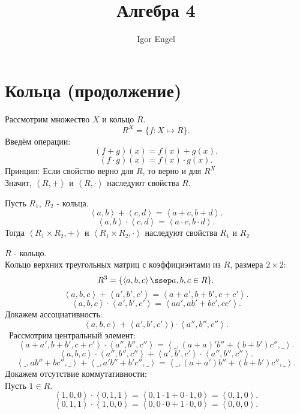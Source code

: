\documentclass[11pt, oneside]{article}   	%
\title{Алгебра 4}
\author{Igor Engel}
\date{}
\begin{document}
\maketitle
\section{Кольца (продолжение)}
    \begin{definition}
        Рассмотрим множество $X$ и кольцо  $R$.\\
         \[ R^{X} = \{f: X \mapsto R\}  .\] 
        Введём операции:
        \[ (f+g)(x) = f(x)+g(x) .\]
        \[ (f\cdot g)(x) = f(x)\cdot g(x) .\]
        Принцип: Если свойство верно для $R$, то верно и для  $R^{X}$ \\
        Значит, $\left<R, +\right>$ и $\left<R, \cdot \right>$ наследуют свойства $R$.
    \end{definition}
    \begin{definition}
        Пусть $R_1$, $R_2$ - кольца.\\
        \[ \left<a, b\right> + \left<c, d\right> = \left<a+c, b+d\right> .\]
        \[ \left<a, b\right>\cdot \left<c, d\right> = \left<a\cdot c, b\cdot d\right> .\] 
        Тогда $\left<R_1 \times R_2, +\right>$ и $\left<R_1 \times R_2, \cdot \right>$ наследуют свойства $R_1$ и $R_2$
    \end{definition} 
    \begin{definition}
        $R$ - кольцо.\\
        Кольцо верхних треугольных матриц с коэффициэнтами из $R$, размера $2\times 2$:
        \[ R^{3} = \{\left<a, b, c\right> \ssep a, b, c\in R\}  .\]
        \[ \left<a, b, c\right> + \left<a', b', c'\right> = \left<a+a', b+b', c+c'\right> .\] 
        \[ \left<a, b, c\right> \cdot \left<a', b', c'\right> = \left<aa', ab' + bc', cc'\right>.\]
        Докажем ассоциативность:
        \[ \left<a, b, c\right> + \left<a', b', c'\right>) \cdot \left<a'', b'', c''\right> .\]\
        Рассмотрим центральный элемент:
        \[ \left<a+a', b+b', c+c'\right> \cdot \left<a'', b'', c''\right> = \left<\_, (a+a)'b''+(b+b')c'', \_\right> .\]
        \[ \left<a, b, c\right>\cdot \left<a'', b'', c''\right> + \left<a', b', c'\right>\cdot \left<a'', b'', c''\right> .\] 
        \[ \left<\_, ab''+bc'', \_\right> + \left<\_, a'b'' + b'c'', \_\right> = \left<\_, (a+a')b'' + (b+b')c'', \_\right> .\]
        Докажем отсутствие коммутативности:\\
        Пусть $1\in R$.\\
        \[ \left<1, 0, 0\right> \cdot \left<0, 1, 1\right> = \left<0, 1\cdot 1 + 0\cdot 1, 0\right> = \left<0, 1, 0\right> .\] 
        \[ \left<0, 1, 1\right> \cdot \left<1, 0, 0\right> = \left<0, 0\cdot 0 + 1\cdot 0, 0\right> = \left<0, 0, 0\right>.\]
    \end{definition}
\end{document}
